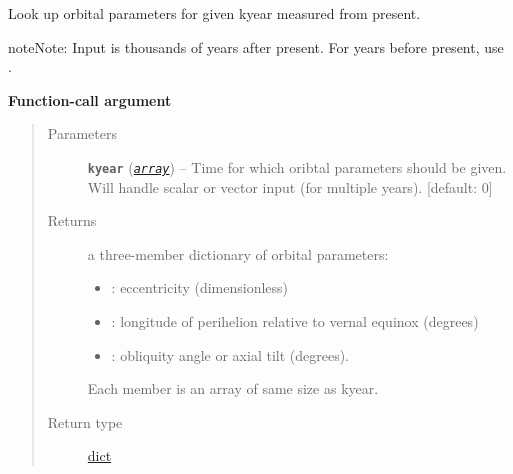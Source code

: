 \documentclass[a4paper,10pt,english]{sphinxmanual}
\begin{document}
\begin{fulllineitems}
\begin{quote}
\begin{description}
\begin{itemize}
\end{itemize}

\end{description}\end{quote}

\begin{fulllineitems}
\label{api/climlab.solar:climlab.solar.orbital.OrbitalTable.lookup_parameters}
Look up orbital parameters for given kyear measured from present.

\begin{notice}{note}{Note:}
Input  is thousands of years after present.
For years before present, use .
\end{notice}

\textbf{Function-call argument}
\begin{quote}\begin{description}
\item[{Parameters}] \leavevmode
\textbf{\texttt{kyear}} (\href{http://docs.python.org/2.7/library/array.html\#module-array}{\emph{\texttt{array}}}) -- Time for which oribtal parameters should be given.     
Will handle scalar or vector input (for multiple years).
{[}default: 0{]}

\item[{Returns}] \leavevmode

a three-member dictionary of orbital parameters:
\begin{itemize}
\item {} 
: eccentricity (dimensionless)

\item {} 
: longitude of perihelion 
relative to vernal equinox (degrees)

\item {} 
: obliquity angle or axial tilt (degrees).

\end{itemize}

Each member is an array of same size as kyear.


\item[{Return type}] \leavevmode
\href{http://docs.python.org/2.7/library/stdtypes.html\#dict}{dict}

\end{description}\end{quote}

\end{fulllineitems}


\end{fulllineitems}
\end{document}
